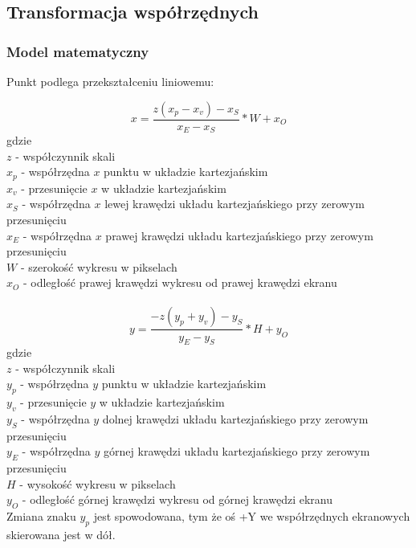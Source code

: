 \documentclass{article}
\begin{document}
	\subsection{Transformacja współrzędnych}
	
	\subsubsection{Model matematyczny}
	Punkt podlega przekształceniu liniowemu:

	\begin{equation}
		x = \frac{z(x_p - x_v) - x_{S}}{x_{E} - x_{S}} * W + x_O
	\end{equation}
	gdzie \\
	$z$ - współczynnik skali \\
	$x_p$ - współrzędna $x$ punktu w układzie kartezjańskim \\
	$x_v$ - przesunięcie $x$ w układzie kartezjańskim \\
	$x_S$ - współrzędna $x$ lewej krawędzi układu kartezjańskiego przy zerowym przesunięciu \\
	$x_E$ - współrzędna $x$ prawej krawędzi układu kartezjańskiego przy zerowym przesunięciu \\
	$W$ - szerokość wykresu w pikselach \\
	$x_O$ - odległość prawej krawędzi wykresu od prawej krawędzi ekranu
	\\\\
	
	\begin{equation}
		y = \frac{-z(y_p + y_v) - y_{S}}{y_{E} - y_{S}} * H + y_O
	\end{equation}
	gdzie \\
	$z$ - współczynnik skali \\
	$y_p$ - współrzędna $y$ punktu w układzie kartezjańskim \\
	$y_v$ - przesunięcie $y$ w układzie kartezjańskim \\
	$y_S$ - współrzędna $y$ dolnej krawędzi układu kartezjańskiego przy zerowym przesunięciu \\
	$y_E$ - współrzędna $y$ górnej krawędzi układu kartezjańskiego przy zerowym przesunięciu \\
	$H$ - wysokość wykresu w pikselach \\
	$y_O$ - odległość górnej krawędzi wykresu od górnej krawędzi ekranu \\
	
	Zmiana znaku $y_p$ jest spowodowana, tym że oś +Y we współrzędnych ekranowych skierowana jest w dół.
	
\end{document}
